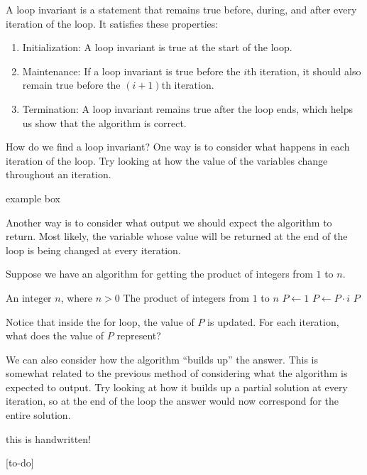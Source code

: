\begin{definition}
A loop invariant is a statement that remains true before, during, and after every iteration of the loop. It satisfies these properties:
\begin{enumerate}
    \item Initialization: A loop invariant is true at the start of the loop.
    \item Maintenance: If a loop invariant is true before the $i$th iteration, it should also remain true before the $\left(i+1\right)$th iteration.
    \item Termination: A loop invariant remains true after the loop ends, which helps us show that the algorithm is correct.
\end{enumerate}
\end{definition}

How do we find a loop invariant? One way is to consider what happens in each iteration of the loop. Try looking at how the value of the variables change throughout an iteration.

\begin{example}
    example box
\end{example}

Another way is to consider what output we should expect the algorithm to return. Most likely, the variable whose value will be returned at the end of the loop is being changed at every iteration.

\begin{example}
    Suppose we have an algorithm for getting the product of integers from $1$ to $n$.
    \begin{algorithm}[H]
        \caption{Get the product of integers from $1$ to $n$ }
        \begin{algorithmic}[1]
            \Require An integer $n$, where $n>0$ 
            \Ensure The product of integers from $1$ to $n$ 
            \State $P \gets 1$
            \State $P \gets P \cdot i$ 
            \EndFor
            \Return $P$
            \EndFunction
        \end{algorithmic}
    \end{algorithm}

    Notice that inside the for loop, the value of $P$ is updated. For each iteration, what does the value of $P$ represent? 
\end{example}

We can also consider how the algorithm ``builds up'' the answer. This is somewhat related to the previous method of considering what the algorithm is expected to output. Try looking at how it builds up a partial solution at every iteration, so at the end of the loop the answer would now correspond for the entire solution.

\begin{handwritten}
    this is handwritten!
\end{handwritten}

\begin{exercises}

[to-do]
\end{exercises}
